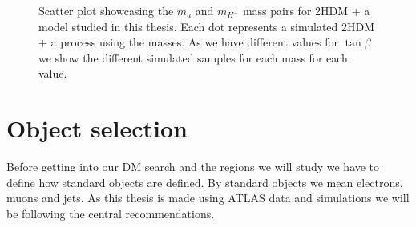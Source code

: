 \documentclass[12pt, a4paper]{book}
\begin{document}
\begin{figure}[!ht]
\begin{subfigure}[b]{0.45\textwidth}
    \end{subfigure}
    \caption[$m_a$ and $m_{H^-}$ mass pairs for 2HDM + a model]{Scatter plot showcasing the $m_a$ and $m_{H^-}$ mass pairs for 2HDM + a model studied in this thesis. Each dot represents a simulated 2HDM + a process using the masses. As we have different values for $\tan\beta$ we show the different simulated samples for each mass for each value.}\label{fig:2HDM_mass}
\end{figure}

\section{Object selection}\label{sec:obj_sel}
Before getting into our DM search and the regions we will study we have to define how standard objects are defined. By standard objects we mean electrons, muons and jets. As this thesis is made using ATLAS data and simulations we will be following the central recommendations.
\end{document}
